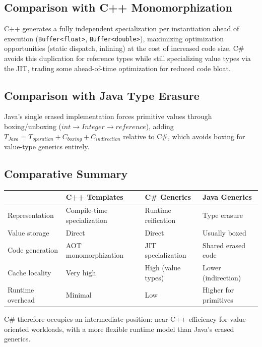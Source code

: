 \documentclass[11pt]{report}
\begin{document}
\subsection{Comparison with C++ Monomorphization}

C++ generates a fully independent specialization per instantiation ahead of
execution (\texttt{Buffer<float>}, \texttt{Buffer<double>}), maximizing
optimization opportunities (static dispatch, inlining) at the cost of
increased code size. C\# avoids this duplication for reference types while
still specializing value types via the JIT, trading some ahead-of-time
optimization for reduced code bloat.

\subsection{Comparison with Java Type Erasure}

Java's single erased implementation forces primitive values through
boxing/unboxing ($int \rightarrow Integer \rightarrow reference$), adding
$T_{Java} = T_{operation} + C_{boxing} + C_{indirection}$ relative to C\#,
which avoids boxing for value-type generics entirely.

\subsection{Comparative Summary}

\begin{table}[h]
\centering
\begin{tabular}{|p{2.6cm}|p{3.4cm}|p{3.4cm}|p{3.4cm}|}
\hline
& C++ Templates & C\# Generics & Java Generics \\
\hline
Representation & Compile-time specialization & Runtime reification & Type erasure \\
\hline
Value storage & Direct & Direct & Usually boxed \\
\hline
Code generation & AOT monomorphization & JIT specialization & Shared erased code \\
\hline
Cache locality & Very high & High (value types) & Lower (indirection) \\
\hline
Runtime overhead & Minimal & Low & Higher for primitives \\
\hline
\end{tabular}
\end{table}

C\# therefore occupies an intermediate position: near-C++ efficiency for
value-oriented workloads, with a more flexible runtime model than Java's
erased generics.
\end{document}
